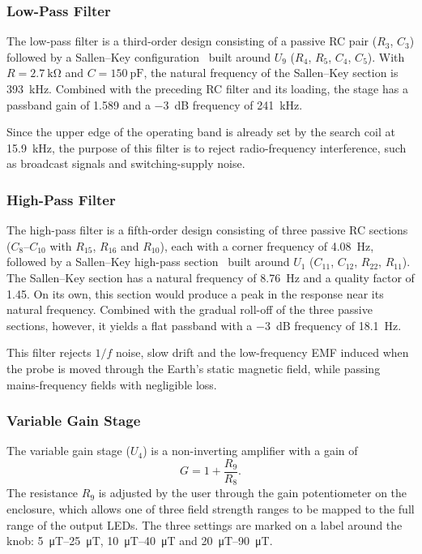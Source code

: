 \documentclass[11pt,a4paper]{article}
\begin{document}
\subsubsection{Low-Pass Filter}
The low-pass filter is a third-order design consisting of a passive RC pair ($R_3$, $C_3$) followed by a Sallen--Key configuration~\cite{karki2002} built around $U_9$ ($R_4$, $R_5$, $C_4$, $C_5$). With $R = \SI{2.7}{\kilo\ohm}$ and $C = \SI{150}{\pico\farad}$, the natural frequency of the Sallen--Key section is \SI{393}{\kilo\hertz}. Combined with the preceding RC filter and its loading, the stage has a passband gain of 1.589 and a \SI{-3}{\deci\bel} frequency of \SI{241}{\kilo\hertz}.

Since the upper edge of the operating band is already set by the search coil at \SI{15.9}{\kilo\hertz}, the purpose of this filter is to reject radio-frequency interference, such as broadcast signals and switching-supply noise.

\subsubsection{High-Pass Filter}
The high-pass filter is a fifth-order design consisting of three passive RC sections ($C_8$--$C_{10}$ with $R_{15}$, $R_{16}$ and $R_{10}$), each with a corner frequency of \SI{4.08}{\hertz}, followed by a Sallen--Key high-pass section~\cite{karki2002} built around $U_1$ ($C_{11}$, $C_{12}$, $R_{22}$, $R_{11}$). The Sallen--Key section has a natural frequency of \SI{8.76}{\hertz} and a quality factor of 1.45. On its own, this section would produce a peak in the response near its natural frequency. Combined with the gradual roll-off of the three passive sections, however, it yields a flat passband with a \SI{-3}{\deci\bel} frequency of \SI{18.1}{\hertz}.

This filter rejects $1/f$ noise, slow drift and the low-frequency EMF induced when the probe is moved through the Earth's static magnetic field, while passing mains-frequency fields with negligible loss.

\subsubsection{Variable Gain Stage}
The variable gain stage ($U_4$) is a non-inverting amplifier with a gain of
\begin{equation}
  G = 1 + \frac{R_9}{R_8}.
  \label{eq:gain}
\end{equation}
The resistance $R_9$ is adjusted by the user through the gain potentiometer on the enclosure, which allows one of three field strength ranges to be mapped to the full range of the output LEDs. The three settings are marked on a label around the knob: \SIrange{5}{25}{\micro\tesla}, \SIrange{10}{40}{\micro\tesla} and \SIrange{20}{90}{\micro\tesla}.
\end{document}
